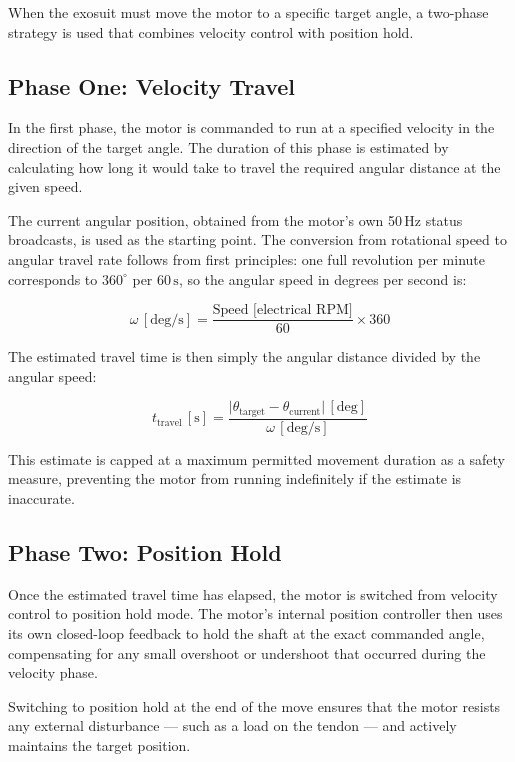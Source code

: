 \documentclass[12pt,a4paper]{article}
\begin{document}
When the exosuit must move the motor to a specific target angle, a two-phase
strategy is used that combines velocity control with position hold.

\subsection{Phase One: Velocity Travel}

In the first phase, the motor is commanded to run at a specified velocity
in the direction of the target angle. The duration of this phase is
estimated by calculating how long it would take to travel the required
angular distance at the given speed.

The current angular position, obtained from the motor's own 50\,Hz status
broadcasts, is used as the starting point. The conversion from rotational
speed to angular travel rate follows from first principles: one full
revolution per minute corresponds to $360^\circ$ per $60\,\text{s}$, so
the angular speed in degrees per second is:

\begin{equation}
  \omega \,[\text{deg/s}]
  = \frac{\text{Speed [electrical RPM]}}{60} \times 360
\end{equation}

The estimated travel time is then simply the angular distance divided by
the angular speed:

\begin{equation}
  t_{\text{travel}} \,[\text{s}]
  = \frac{\lvert \theta_{\text{target}} - \theta_{\text{current}} \rvert \,[\text{deg}]}
         {\omega \,[\text{deg/s}]}
\end{equation}

This estimate is capped at a maximum permitted movement duration as a
safety measure, preventing the motor from running indefinitely if the
estimate is inaccurate.

\subsection{Phase Two: Position Hold}

Once the estimated travel time has elapsed, the motor is switched from
velocity control to position hold mode. The motor's internal position
controller then uses its own closed-loop feedback to hold the shaft at
the exact commanded angle, compensating for any small overshoot or
undershoot that occurred during the velocity phase.

Switching to position hold at the end of the move ensures that the motor
resists any external disturbance --- such as a load on the tendon --- and
actively maintains the target position.
\end{document}

